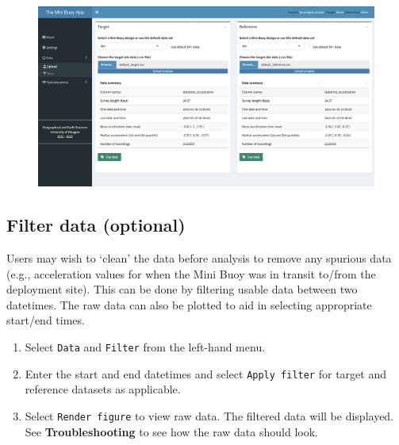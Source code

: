 \documentclass[
  letterpaper,
  DIV=11,
  numbers=noendperiod]{scrreprt}
\providecommand{\tightlist}{%
  \setlength{\itemsep}{0pt}\setlength{\parskip}{0pt}}\usepackage{longtable,booktabs,array}
\begin{document}
\begin{figure}

{\centering \includegraphics[width=1\textwidth,height=\textheight]{chapters/figs/DataUpload.png}

}

\end{figure}

\hypertarget{filter-data-optional}{%
\subsection{Filter data (optional)}\label{filter-data-optional}}

Users may wish to `clean' the data before analysis to remove any
spurious data (e.g., acceleration values for when the Mini Buoy was in
transit to/from the deployment site). This can be done by filtering
usable data between two datetimes. The raw data can also be plotted to
aid in selecting appropriate start/end times.

\begin{enumerate}
\def\labelenumi{\arabic{enumi}.}
\tightlist
\item
  Select \texttt{Data} and \texttt{Filter} from the left-hand menu.
\item
  Enter the start and end datetimes and select \texttt{Apply\ filter}
  for target and reference datasets as applicable.
\item
  Select \texttt{Render\ figure} to view raw data. The filtered data
  will be displayed. See \textbf{Troubleshooting} to see how the raw
  data should look.
\end{enumerate}
\end{document}
